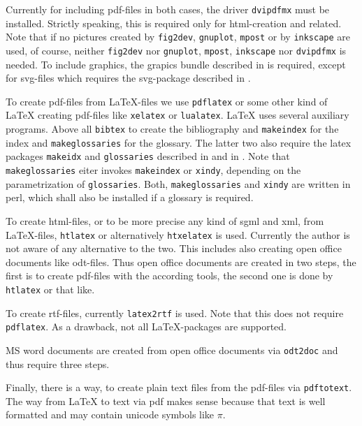 \documentclass[12pt]{article}
\begin{document}
Currently for including pdf-files in both cases, 
the driver {\tt dvipdfmx} must be installed. 
Strictly speaking, this is required only for html-creation and related. 
Note that if no pictures created by {\tt fig2dev}, {\tt gnuplot}, 
{\tt mpost} or by {\tt inkscape} are used, of course, 
neither {\tt fig2dev} nor {\tt gnuplot}, {\tt mpost}, {\tt inkscape} 
nor {\tt dvipdfmx} is needed. 
To include graphics, the grapics bundle described in \cite{GraX} is required, 
except for svg-files which requires the svg-package 
described in \cite{SvgP}. 

To create pdf-files from \LaTeX-files we use {\tt pdflatex} 
or some other kind of \LaTeX{} creating pdf-files 
like {\tt xelatex} or {\tt lualatex}. 
\LaTeX{} uses several auxiliary programs. 
Above all {\tt bibtex} to create the bibliography 
and {\tt makeindex} for the index and {\tt makeglossaries} for the glossary. 
The latter two 
also require the latex packages {\tt makeidx} and {\tt glossaries} 
described in \cite{MkidxShIdxP} and in \cite{GloP}. 
Note that {\tt makeglossaries} eiter invokes {\tt makeindex} 
or {\tt xindy}, depending on the parametrization of {\tt glossaries}. 
Both, {\tt makeglossaries} and {\tt xindy} are written in perl, 
which shall also be installed if a glossary is required. 

To create \gls{html}-files, 
or to be more precise any kind of \gls{sgml} and \gls{xml}, 
from \LaTeX-files, {\tt htlatex} or alternatively {\tt htxelatex} is used. 
Currently the author is not aware of any alternative to the two. 
This includes also creating open office documents like odt-files. 
Thus open office documents are created in two steps, 
the first is to create pdf-files with the according tools, 
the second one is done by {\tt htlatex} or that like. 

To create rtf-files, currently {\tt latex2rtf} is used. 
Note that this does not require {\tt pdflatex}. 
As a drawback, not all \LaTeX-packages are supported. 

MS word documents are created from open office documents via {\tt odt2doc} 
and thus require three steps. 

Finally, there is a way, to create plain text files from the pdf-files 
via {\tt pdftotext}. 
The way from \LaTeX{} to text via pdf makes sense 
because that text is well formatted 
and may contain unicode symbols like $\pi$. 
\end{document}
